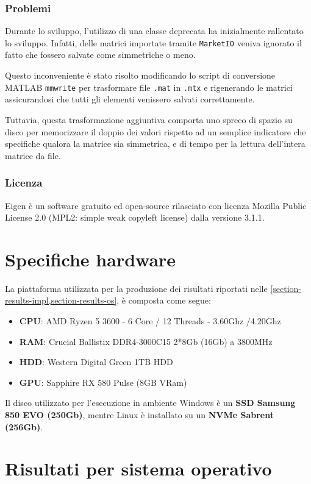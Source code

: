 \documentclass[11pt,italian]{article}
\begin{document}
\subsubsection{Problemi}
Durante lo sviluppo, l'utilizzo di una classe deprecata ha inizialmente rallentato lo sviluppo. Infatti, delle matrici importate tramite \lstinline{MarketIO} veniva ignorato il fatto che fossero salvate come simmetriche o meno.

Questo inconveniente è stato risolto modificando lo script di conversione MATLAB \lstinline{mmwrite} per trasformare file \lstinline{.mat} in \lstinline{.mtx} e rigenerando le matrici assicurandosi che tutti gli elementi venissero salvati correttamente.

Tuttavia, questa trasformazione aggiuntiva comporta uno spreco di spazio su disco per memorizzare il doppio dei valori rispetto ad un semplice indicatore che specifiche qualora la matrice sia simmetrica, e di tempo per la lettura dell'intera matrice da file.

\subsubsection{Licenza}
Eigen è un software gratuito ed open-source rilasciato con licenza Mozilla Public License 2.0 (MPL2: simple weak copyleft license) dalla versione 3.1.1.

\newpage
\section{Specifiche hardware}
La piattaforma utilizzata per la produzione dei risultati riportati nelle \cref{section-results-impl,section-results-os}, è composta come segue:
\begin{itemize}
	\item \textbf{CPU}: AMD Ryzen 5 3600 - 6 Core / 12 Threads - 3.60Ghz /4.20Ghz
	\item \textbf{RAM}: Crucial Ballistix DDR4-3000C15 2*8Gb (16Gb) a 3800MHz
	\item \textbf{HDD}: Western Digital Green 1TB HDD
	\item \textbf{GPU}: Sapphire RX 580 Pulse (8GB VRam)
\end{itemize}

\noindent
Il disco utilizzato per l'esecuzione in ambiente Windows è un \textbf{SSD Samsung 850 EVO (250Gb)}, mentre Linux è installato su un \textbf{NVMe Sabrent (256Gb)}.

\newpage
\section{Risultati per sistema operativo}
\label{section-results-impl}
\end{document}
